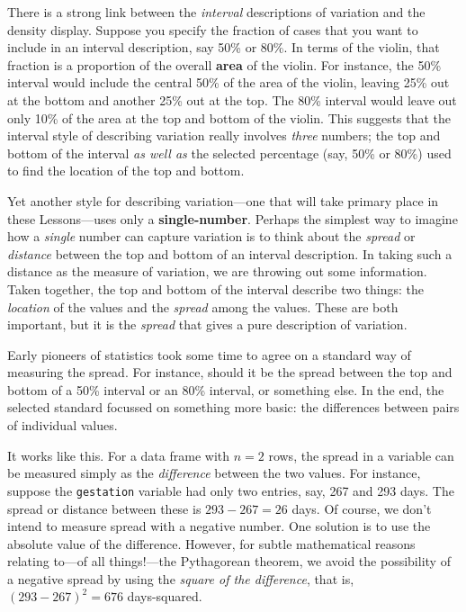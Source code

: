 \documentclass[
  letterpaper,
  DIV=11,
  numbers=noendperiod,
  oneside]{scrreprt}
\begin{document}
There is a strong link between the \emph{interval} descriptions of
variation and the density display. Suppose you specify the fraction of
cases that you want to include in an interval description, say 50\% or
80\%. In terms of the violin, that fraction is a proportion of the
overall \textbf{area} of the violin. For instance, the 50\% interval
would include the central 50\% of the area of the violin, leaving 25\%
out at the bottom and another 25\% out at the top. The 80\% interval
would leave out only 10\% of the area at the top and bottom of the
violin. This suggests that the interval style of describing variation
really involves \emph{three} numbers; the top and bottom of the interval
\emph{as well as} the selected percentage (say, 50\% or 80\%) used to
find the location of the top and bottom.

Yet another style for describing variation---one that will take primary
place in these Lessons---uses only a \textbf{single-number}. Perhaps the
simplest way to imagine how a \emph{single} number can capture variation
is to think about the \emph{spread} or \emph{distance} between the top
and bottom of an interval description. In taking such a distance as the
measure of variation, we are throwing out some information. Taken
together, the top and bottom of the interval describe two things: the
\emph{location} of the values and the \emph{spread} among the values.
These are both important, but it is the \emph{spread} that gives a pure
description of variation.

Early pioneers of statistics took some time to agree on a standard way
of measuring the spread. For instance, should it be the spread between
the top and bottom of a 50\% interval or an 80\% interval, or something
else. In the end, the selected standard focussed on something more
basic: the differences between pairs of individual values.

It works like this. For a data frame with \(n=2\) rows, the spread in a
variable can be measured simply as the \emph{difference} between the two
values. For instance, suppose the \texttt{gestation} variable had only
two entries, say, 267 and 293 days. The spread or distance between these
is \(293-267 = 26\) days. Of course, we don't intend to measure spread
with a negative number. One solution is to use the absolute value of the
difference. However, for subtle mathematical reasons relating to---of
all things!---the Pythagorean theorem, we avoid the possibility of a
negative spread by using the \emph{square of the difference}, that is,
\((293 - 267)^2 = 676\) days-squared.
\end{document}
